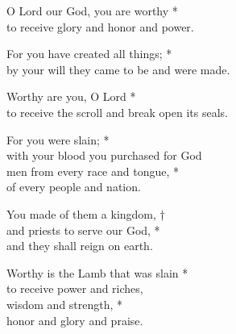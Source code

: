
O Lord our God, you are worthy *\\
to receive glory and honor and power.

For you have created all things; *\\
by your will they came to be and were made.

Worthy are you, O Lord *\\
to receive the scroll and break open its seals.

For you were slain; *\\
with your blood you purchased for God\\
men from every race and tongue, *\\
of every people and nation.

You made of them a kingdom, †\\
and priests to serve our God, *\\
and they shall reign on earth.

Worthy is the Lamb that was slain *\\
to receive power and riches,\\
wisdom and strength, *\\
honor and glory and praise.
